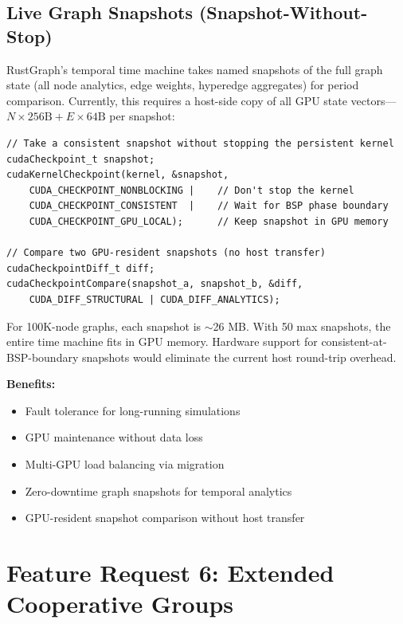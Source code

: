 \documentclass[11pt,a4paper]{article}
\newenvironment{benefitsbox}{%
    \vspace{6pt}%
    \noindent\textbf{Benefits:}%
    \begin{itemize}[leftmargin=1.5em,topsep=2pt,itemsep=1pt]%
}{%
    \end{itemize}%
    \vspace{6pt}%
}
\begin{document}
\subsection{Live Graph Snapshots (Snapshot-Without-Stop)}

RustGraph's temporal time machine takes named snapshots of the full graph state (all node analytics, edge weights, hyperedge aggregates) for period comparison. Currently, this requires a host-side copy of all GPU state vectors---$N \times 256\text{B} + E \times 64\text{B}$ per snapshot:

\begin{lstlisting}[style=cstyle,title={Proposed: GPU-side snapshot without stopping the kernel}]
// Take a consistent snapshot without stopping the persistent kernel
cudaCheckpoint_t snapshot;
cudaKernelCheckpoint(kernel, &snapshot,
    CUDA_CHECKPOINT_NONBLOCKING |    // Don't stop the kernel
    CUDA_CHECKPOINT_CONSISTENT  |    // Wait for BSP phase boundary
    CUDA_CHECKPOINT_GPU_LOCAL);      // Keep snapshot in GPU memory

// Compare two GPU-resident snapshots (no host transfer)
cudaCheckpointDiff_t diff;
cudaCheckpointCompare(snapshot_a, snapshot_b, &diff,
    CUDA_DIFF_STRUCTURAL | CUDA_DIFF_ANALYTICS);
\end{lstlisting}

For 100K-node graphs, each snapshot is $\sim$26 MB. With 50 max snapshots, the entire time machine fits in GPU memory. Hardware support for consistent-at-BSP-boundary snapshots would eliminate the current host round-trip overhead.

\begin{benefitsbox}
    \item Fault tolerance for long-running simulations
    \item GPU maintenance without data loss
    \item Multi-GPU load balancing via migration
    \item Zero-downtime graph snapshots for temporal analytics
    \item GPU-resident snapshot comparison without host transfer
\end{benefitsbox}

\newpage

\section{Feature Request 6: Extended Cooperative Groups}
\end{document}
